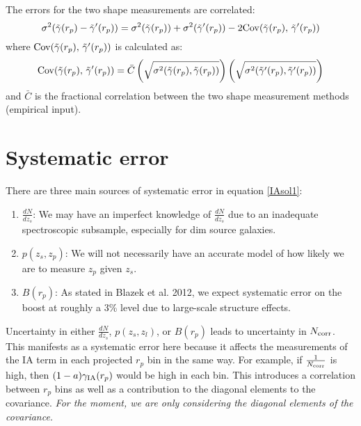 \documentclass[onecolumn,amsmath,aps,fleqn, superscriptaddress]{revtex4}
\begin{document}
The errors for the two shape measurements are correlated:
\begin{equation}
\sigma^2(\tilde{\gamma}(r_p) - \tilde{\gamma}^\prime(r_p)) = \sigma^2(\tilde{\gamma}(r_p)) + \sigma^2(\tilde{\gamma}^\prime(r_p)) - 2 {\rm Cov}( \tilde{\gamma}(r_p), \, \tilde{\gamma}^\prime(r_p))
\label{comb_gammat}
\end{equation}
where ${\rm Cov}( \tilde{\gamma}(r_p), \, \tilde{\gamma}^\prime(r_p))$ is calculated as:
\begin{equation}
{\rm Cov}( \tilde{\gamma}(r_p), \, \tilde{\gamma}^\prime(r_p)) = \bar{C} \left(\sqrt{\sigma^2(\tilde{\gamma}(r_p), \tilde{\gamma}(r_p))}\right)\left(\sqrt{\sigma^2(\tilde{\gamma}^\prime(r_p), \tilde{\gamma}^\prime(r_p))}\right)
\label{Cov}
\end{equation}
and $\bar{C}$ is the fractional correlation between the two shape measurement methods (empirical input).

\section*{Systematic error}

There are three main sources of systematic error in equation \ref{IAsol1}:
\begin{enumerate}
\item{$\frac{dN}{dz_s}$: We may have an imperfect knowledge of $\frac{dN}{dz_s}$ due to an inadequate spectroscopic subsample, especially for dim source galaxies.}
\item{$p(z_s, z_p)$: We will not necessarily have an accurate model of how likely we are to measure $z_p$ given $z_s$.}
\item{$B(r_p)$: As stated in Blazek et al. 2012, we expect systematic error on the boost at roughly a 3\% level due to large-scale structure effects.}
\end{enumerate}

Uncertainty in either $\frac{dN}{dz_s}$, $p(z_s, z_l)$, or $B(r_p)$ leads to uncertainty in $N_{\rm corr}$. This manifests as a systematic error here because it affects the measurements of the IA term in each projected $r_p$ bin in the same way. For example, if $\frac{1}{N_{\rm corr}}$ is high, then $(1-a)\gamma_{\rm IA}(r_p)$ would be high in each bin. This introduces a correlation between $r_p$ bins as well as a contribution to the diagonal elements to the covariance. {\it For the moment, we are only considering the diagonal elements of the covariance.}
\end{document}
